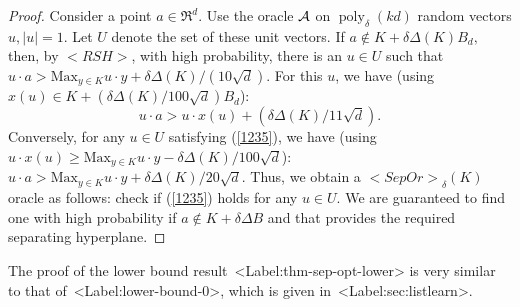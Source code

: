 \documentclass[11pt,letterpaper]{article}
\newcounter{note}[section]
\def\mathsf#1{<#1>}%
\def\xspace{}%
\def\Cref#1{<Label:#1>}%
\theoremstyle{definition}
\theoremstyle{remark}
\newcommand{\poly}{\operatorname{poly}}
\newcommand{\rsh}{{\mathsf {RSH}}\xspace}
\newcommand{\sep}{{\mathsf{SepOr}}}
\begin{document}
\sepopt*
\begin{proof}
Consider a point $a \in \Re^d$. 
Use the  oracle $\cal A$ on $\poly_\delta(kd)$ random vectors $u, |u|=1$. Let $U$ denote the set of these unit vectors. If $a\notin K+\delta\Delta(K) B_d,$ then, by $\rsh$, with high probability, there is an $u \in U$ such that $u\cdot a> \mbox{Max}_{y\in K}u\cdot y+\delta\Delta(K)/(10\sqrt d)$. For this $u$, we have (using 
$x(u)\in K+(\delta\Delta(K)/100\sqrt d)B_d$):
\begin{equation}\label{1235}
u\cdot a>u\cdot x(u) +(\delta \Delta(K)/11\sqrt d). \end{equation}
Conversely, for any $u \in U$ satisfying (\ref{1235}),
we have (using $u\cdot x(u)\geq \mbox{Max}_{y\in K}u\cdot y-\delta\Delta(K) /100\sqrt d$):
$u\cdot a> \mbox{Max}_{y\in K}u\cdot y +
\delta\Delta(K) /20\sqrt d$.
Thus, we obtain a $\sep_\delta(K)$ oracle as follows: check if (\ref{1235}) holds for any $u \in U$. We are guaranteed to find one with high probability if $a\notin K+\delta\Delta B$ and that provides the required separating hyperplane.
\end{proof}

The proof of the lower bound result~\Cref{thm-sep-opt-lower} is very similar to that of~\Cref{lower-bound-0}, which is given in~\Cref{sec:listlearn}. 



\end{document}
